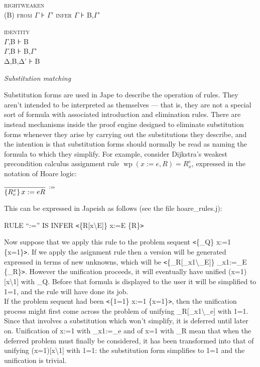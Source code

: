 \textsc{rightweaken\\
(B) from} \textsc{\ensuremath{\Gamma}} \textsc{⊦} \textsc{\ensuremath{\Gamma}}\textsc{'} \textsc{infer} \textsc{\ensuremath{\Gamma}} \textsc{⊦} \textsc{B,}\textsc{\ensuremath{\Gamma}}\textsc{'}

\textsc{identity\tab }\\
\textsc{\ensuremath{\Gamma}}\textsc{,B} \textsc{⊦} \textsc{B}\\
\textsc{\ensuremath{\Gamma}}\textsc{,B} \textsc{⊦} \textsc{B,}\textsc{\ensuremath{\Gamma}}\textsc{'}\\
\textsc{Δ}\textsc{,B,}\textsc{Δ}\textsc{'} \textsc{⊦} \textsc{B}


\textit{Substitution matching}


Substitution forms are used in Jape to describe the operation of rules. They aren't intended to be interpreted as themselves --- that is, they are not a special sort of formula with associated introduction and elimination rules. There are instead mechanisms inside the proof engine designed to eliminate substitution forms whenever they arise by carrying out the substitutions they describe, and the intention is that substitution forms should normally be read as naming the formula to which they simplify. For example, consider Dijkstra's weakest precondition calculus assignment rule $\operatorname{wp}(x:=e,R)=R_{x}^{e} $, expressed in the notation of Hoare logic:


$\infer[\reason{$:=$}]
       {\left\{ R^{x}_{e} \right\} x:=e{R}}
       {}$

This can be expressed in Japeish as follows (see the file hoare\_rules.j):

{\small RULE ``:='' IS INFER \texttt{<}\{R[x{\textbackslash}E]\} x:=E \{R\}\texttt{>}}


Now suppose that we apply this rule to the problem sequent {\small \texttt{<}\{\_Q\} x:=1 \{x=1\}\texttt{>}}. If we apply the asignment rule then a version will be generated expressed in terms of new unknowns, which will be {\small \texttt{<}\{\_R[\_x1{\textbackslash}\_E]\} \_x1:=\_E \{\_R\}\texttt{>}}. However the unification proceeds, it will eventually have unified {\small (x=1)[x{\textbackslash}1]} with {\small \_Q}. Before that formula is displayed to the user it will be simplified to {\small 1=1}, and the rule will have done its job.\\
If the problem sequent had been {\small \texttt{<}\{1=1\} x:=1 \{x=1\}\texttt{>}}, then the unification process might first come across the problem of unifying {\small \_R[\_x1{\textbackslash}\_e]} with {\small 1=1}. Since that involves a substitution which won't simplify, it is deferred until later on. Unification of {\small x:=1} with {\small \_x1:=\_e} and of {\small x=1} with {\small \_R} mean that when the deferred problem must finally be considered, it has been transformed into that of unifying {\small (x=1)[x{\textbackslash}1]} with {\small 1=1}: the substitution form simplifies to {\small 1=1} and the unification is trivial.


